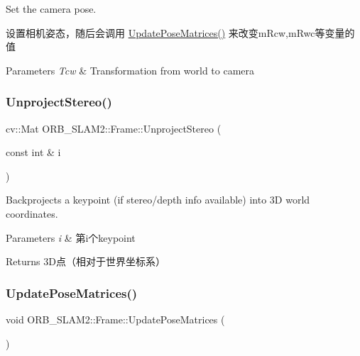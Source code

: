 Set the camera pose. 

设置相机姿态，随后会调用 \mbox{\hyperlink{class_o_r_b___s_l_a_m2_1_1_frame_a0a18d3024a23f6fa2cab9c7d987598c2}{Update\+Pose\+Matrices()}} 来改变m\+Rcw,m\+Rwc等变量的值 
\begin{DoxyParams}{Parameters}
{\em Tcw} & Transformation from world to camera \\
\hline
\end{DoxyParams}
\mbox{\label{class_o_r_b___s_l_a_m2_1_1_frame_a46084d187e1fc60181e1c72f77c733ca}} 
\subsubsection{\texorpdfstring{Unproject\+Stereo()}{UnprojectStereo()}}
{\footnotesize\ttfamily cv\+::\+Mat O\+R\+B\+\_\+\+S\+L\+A\+M2\+::\+Frame\+::\+Unproject\+Stereo (\begin{DoxyParamCaption}\item[{const int \&}]{i }\end{DoxyParamCaption})}



Backprojects a keypoint (if stereo/depth info available) into 3D world coordinates. 


\begin{DoxyParams}{Parameters}
{\em i} & 第i个keypoint \\
\hline
\end{DoxyParams}
\begin{DoxyReturn}{Returns}
3\+D点（相对于世界坐标系） 
\end{DoxyReturn}
\mbox{\label{class_o_r_b___s_l_a_m2_1_1_frame_a0a18d3024a23f6fa2cab9c7d987598c2}} 
\subsubsection{\texorpdfstring{Update\+Pose\+Matrices()}{UpdatePoseMatrices()}}
{\footnotesize\ttfamily void O\+R\+B\+\_\+\+S\+L\+A\+M2\+::\+Frame\+::\+Update\+Pose\+Matrices (\begin{DoxyParamCaption}{ }\end{DoxyParamCaption})}



